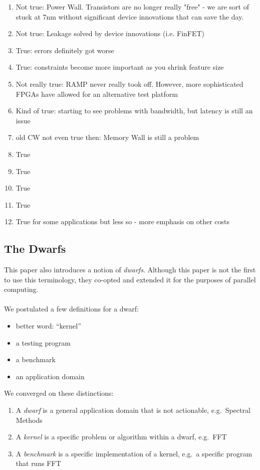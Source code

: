 \begin{enumerate}
    \item Not true: Power Wall. Transistors are no longer really "free" - we are sort of stuck at 7nm without significant device innovations that can save the day.
    \item Not true: Leakage solved by device innovations (i.e. FinFET)
    \item True: errors definitely got worse
    \item True: constraints become more important as you shrink feature size
    \item Not really true: RAMP never really took off. However, more sophisticated FPGAs have allowed for an alternative test platform
    \item Kind of true: starting to see problems with bandwidth, but latency is still an issue
    \item old CW not even true then: Memory Wall is still a problem
    \item True
    \item True
    \item True
    \item True
    \item True for some applications but less so - more emphasis on other costs
\end{enumerate}

\subsection{The Dwarfs}\label{feb-11:a-view:dwarfs}

This paper also introduces a notion of \textit{dwarfs}.
Although this paper is not the first to use this terminology, they co-opted and extended it for the purposes of parallel computing.
\\ \\
We postulated a few definitions for a dwarf:
\begin{itemize}
    \item better word: ``kernel''
    \item a testing program
    \item a benchmark
    \item an application domain
\end{itemize}

We converged on these distinctions:
\begin{enumerate}
    \item A \textit{dwarf} is a general application domain that is not actionable, e.g.\ Spectral Methods
    \item A \textit{kernel} is a specific problem or algorithm within a dwarf, e.g.\ FFT
    \item A \textit{benchmark} is a specific implementation of a kernel, e.g.\ a specific program that runs FFT
\end{enumerate}

